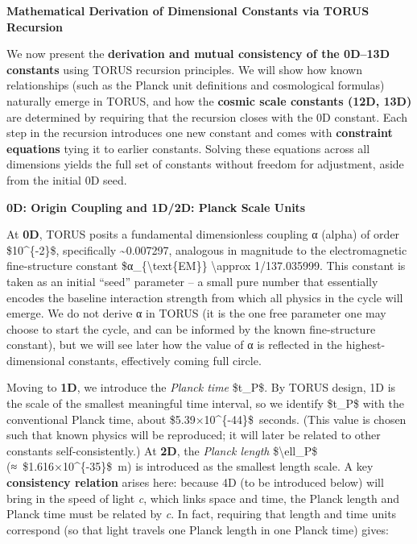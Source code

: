\documentclass[]{article}
\begin{document}
\textbf{Mathematical Derivation of Dimensional Constants via TORUS
Recursion}

We now present the \textbf{derivation and mutual consistency of the
0D--13D constants} using TORUS recursion principles. We will show how
known relationships (such as the Planck unit definitions and
cosmological formulas) naturally emerge in TORUS, and how the
\textbf{cosmic scale constants (12D, 13D)} are determined by requiring
that the recursion closes with the 0D constant. Each step in the
recursion introduces one new constant and comes with \textbf{constraint
equations} tying it to earlier constants. Solving these equations across
all dimensions yields the full set of constants without freedom for
adjustment, aside from the initial 0D seed.

\textbf{0D: Origin Coupling and 1D/2D: Planck Scale Units}

At \textbf{0D}, TORUS posits a fundamental dimensionless coupling α
(alpha) of order \$10\^{}\{-2\}\$, specifically
\textasciitilde{}0.007297, analogous in magnitude to the electromagnetic
fine-structure constant \$α\_\{\textbackslash{}text\{EM\}\}
\textbackslash{}approx 1/137.035999​. This constant is taken as an
initial ``seed'' parameter -- a small pure number that essentially
encodes the baseline interaction strength from which all physics in the
cycle will emerge. We do not derive α in TORUS (it is the one free
parameter one may choose to start the cycle, and can be informed by the
known fine-structure constant), but we will see later how the value of α
is reflected in the highest-dimensional constants, effectively coming
full circle.

Moving to \textbf{1D}, we introduce the \emph{Planck time} \$t\_P\$. By
TORUS design, 1D is the scale of the smallest meaningful time interval,
so we identify \$t\_P\$ with the conventional Planck time, about
\$5.39×10\^{}\{-44\}\$~seconds. (This value is chosen such that known
physics will be reproduced; it will later be related to other constants
self-consistently.) At \textbf{2D}, the \emph{Planck length}
\$\textbackslash{}ell\_P\$ (≈~\$1.616×10\^{}\{-35\}\$~m) is introduced
as the smallest length scale​. A key \textbf{consistency relation}
arises here: because 4D (to be introduced below) will bring in the speed
of light \emph{c}, which links space and time, the Planck length and
Planck time must be related by \emph{c}. In fact, requiring that length
and time units correspond (so that light travels one Planck length in
one Planck time) gives:
\end{document}
